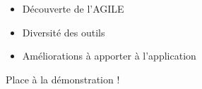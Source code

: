 \begin{frame}
\begin{itemize}
\item Découverte de l'AGILE
\item Diversité des outils
\item Améliorations à apporter à l'application
\end{itemize}
\end{frame}

\begin{frame}
Place à la démonstration !
\end{frame}
